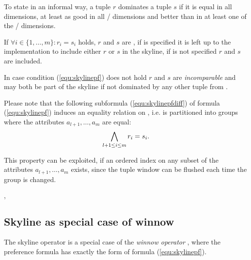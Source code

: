 To state in an informal way, a tuple $r$ dominates a tuple $s$ if it is equal in all  dimensions, at least as good in all / dimensions and better than in at least one of the / dimensions.



If $\forall i \in \{1, \ldots, m\}: r_i = s_i$ holds, $r$ and $s$ are , if  is specified it is left up to the implementation to include either $r$ or $s$ in the skyline, if  is not specified $r$ and $s$ are included. 


In case condition (\ref{equ:skylinepf}) does not hold $r$ and $s$ are \emph{incomparable} and may both be part of the skyline if not dominated by any other tuple from .

Please note that the following subformula (\ref{equ:skylinepfdiff}) of formula (\ref{equ:skylinepf}) induces an equality relation on , i.e.  is partitioned into groups where the attributes $a_{l+1}, \ldots, a_m$ are equal:
\begin{equation}\label{equ:skylinepfdiff}
\bigwedge_{l+1 \le i \le m} r_i = s_i.
\end{equation}


This property can be exploited, if an ordered index on any subset of the attributes $a_{l+1}, \ldots, a_m$ exists, since the tuple window can be flushed each time the group is changed.

, 

\subsection{Skyline as special case of winnow}
The skyline operator is a special case of the \emph{winnow operator} \citep{Chomicki2002}, where the preference formula has exactly the form of formula (\ref{equ:skylinepf}).

